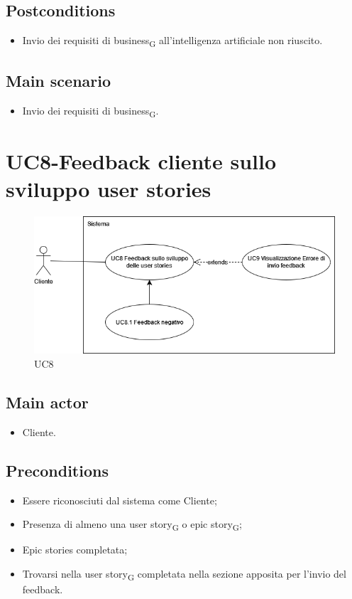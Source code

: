 \documentclass{article}
\begin{document}
     \subsection*{Postconditions} 
        \begin{itemize}
            \item Invio dei requisiti di business\textsubscript{G} all'intelligenza artificiale non riuscito.
        \end{itemize}
        \subsection*{Main scenario}
        \begin{itemize}
        \item Invio dei requisiti di business\textsubscript{G}.
        \end{itemize}


\section{UC8-Feedback cliente sullo sviluppo user stories}
    \begin{figure}[h]
      \centering
      \includegraphics[width=.8\textwidth, height=.6\textheight, keepaspectratio]{documenti/imgUML/UC8-FEEDBACK-CLIENTE-SVILUPPO-USER-STORIES.drawio.png}
        \caption{UC8}
      \label{fig:UC8}
    \end{figure}
    
    \subsection*{Main actor}
    \begin{itemize}
        \item Cliente.
    \end{itemize}
    
    \subsection*{Preconditions}
    \begin{itemize}
        \item Essere riconosciuti dal sistema come Cliente;
        \item Presenza di almeno una user story\textsubscript{G}  o epic story\textsubscript{G};
        \item Epic stories completata;
        \item Trovarsi nella user story\textsubscript{G} completata nella sezione apposita per l'invio del feedback.
    \end{itemize}
    
\end{document}
